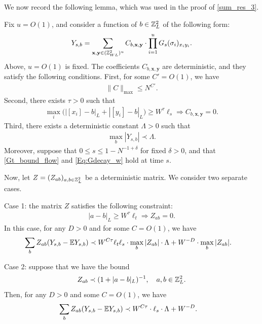 We now record the following lemma, which was used in the proof of \eqref{sum_res_3}. 
\begin{lemma}\label{clt-lemma}
Fix $u=O(1)$, and consider a function of $b\in\mathbb{Z}_{L}^{2}$ of the following form:
%
\begin{align}
Y_{s,b}=\sum_{\textbf{x},\textbf{y}\in(\mathbb{Z}_{WL}^{2})^{u}}C_{b,\textbf{x},\textbf{y}}\cdot\prod_{i=1}^{u}G_{s}(\sigma_{i})_{x_{i}y_{i}}.\label{clt-yform}
\end{align}
%
Above, $u=O(1)$ is fixed. The coefficients $C_{b,\textbf{x},\textbf{y}}$ are deterministic, and they satisfy the following conditions. First, for some $C'=O(1)$, we have 
%
\begin{align*}
\|C\|_{\max}\leq N^{C'}.
\end{align*}
%
Second, there exists $\tau>0$ such that 
%
\begin{align*}
\max_{i}\Big(|[x_{i}]-b|_{L}+|[y_{i}]-b|_{L}\Big)\geq W^{\tau}\ell_{s} \Rightarrow C_{b,\textbf{x},\textbf{y}}=0.
\end{align*}
%
{Third, there exists a deterministic constant $\Lambda>0$ such that 
%
\begin{align*}
\max_{b}|Y_{s,b}|\prec\Lambda.   
\end{align*}
}
Moreover, suppose that $0\leq s\leq 1-N^{-1+\delta}$ for fixed $\delta>0$, and that \eqref{Gt_bound_flow} and \eqref{Eq:Gdecay_w} hold at time $s$. 

Now, let $Z=(Z_{ab})_{a,b\in\mathbb{Z}_{L}^{2}}$ be a deterministic matrix. We consider two separate cases.
\medskip

Case 1: the matrix $Z$ satisfies the following constraint: 
%
\begin{align}
|a-b|_{L}\geq W^{\tau}\ell_{t} \Rightarrow Z_{ab}=0.\label{clt-zrange}
\end{align}
%
In this case, for any $D>0$ and for some $C=O(1)$, we have
%
\begin{align}
\sum_{b}Z_{ab}(Y_{s,b}-\mathbb{E} Y_{s,b})&\prec W^{C\tau}\ell_{t}\ell_{s}\cdot\max_{b}|Z_{ab}|\cdot\Lambda+W^{-D}\cdot \max_{b}|Z_{ab}|.\label{clt-lemma-final-result}
\end{align}
%

{Case 2: suppose that we have the bound
%
\begin{align}
Z_{ab}\prec(1+|a-b|_{L})^{-1},\quad a,b\in\mathbb{Z}_{L}^{2}.\label{clt-z-form}
\end{align}
%
Then, for any $D>0$ and some $C=O(1)$, we have
%
\begin{align}
 \sum_{b}Z_{ab}(Y_{s,b}-\mathbb{E} Y_{s,b})&\prec W^{C\tau}\cdot \ell_{s}\cdot\Lambda+W^{-D}.   \label{clt-lemma-final-result2}
\end{align}
}\end{lemma}
